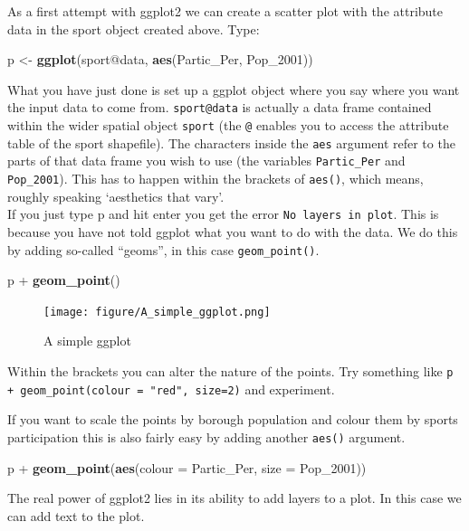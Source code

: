 \documentclass[]{article}
\newenvironment{Shaded}{}{}
\newcommand{\KeywordTok}[1]{\textcolor[rgb]{0.00,0.44,0.13}{\textbf{{#1}}}}
\newcommand{\DataTypeTok}[1]{\textcolor[rgb]{0.56,0.13,0.00}{{#1}}}
\newcommand{\NormalTok}[1]{{#1}}
\begin{document}
As a first attempt with ggplot2 we can create a scatter plot with the
attribute data in the sport object created above. Type:

\begin{Shaded}
\begin{Highlighting}[]
\NormalTok{p <- }\KeywordTok{ggplot}\NormalTok{(sport@data, }\KeywordTok{aes}\NormalTok{(Partic_Per, Pop_2001))}
\end{Highlighting}
\end{Shaded}
What you have just done is set up a ggplot object where you say where
you want the input data to come from. \texttt{sport@data} is actually a
data frame contained within the wider spatial object \texttt{sport} (the
\texttt{@} enables you to access the attribute table of the sport
shapefile). The characters inside the \texttt{aes} argument refer to the
parts of that data frame you wish to use (the variables
\texttt{Partic\_Per} and \texttt{Pop\_2001}). This has to happen within
the brackets of \texttt{aes()}, which means, roughly speaking
`aesthetics that vary'.\\If you just type p and hit enter you get the
error \texttt{No layers in plot}. This is because you have not told
ggplot what you want to do with the data. We do this by adding so-called
``geoms'', in this case \texttt{geom\_point()}.

\begin{Shaded}
\begin{Highlighting}[]
\NormalTok{p + }\KeywordTok{geom_point}\NormalTok{()}
\end{Highlighting}
\end{Shaded}
\begin{figure}[htbp]
\centering
\texttt{[image: figure/A\_simple\_ggplot.png]}
\caption{A simple ggplot}
\end{figure}

Within the brackets you can alter the nature of the points. Try
something like \texttt{p + geom\_point(colour = "red", size=2)} and
experiment.

If you want to scale the points by borough population and colour them by
sports participation this is also fairly easy by adding another
\texttt{aes()} argument.

\begin{Shaded}
\begin{Highlighting}[]
\NormalTok{p + }\KeywordTok{geom_point}\NormalTok{(}\KeywordTok{aes}\NormalTok{(}\DataTypeTok{colour =} \NormalTok{Partic_Per, }\DataTypeTok{size =} \NormalTok{Pop_2001))}
\end{Highlighting}
\end{Shaded}
The real power of ggplot2 lies in its ability to add layers to a plot.
In this case we can add text to the plot.
\end{document}
